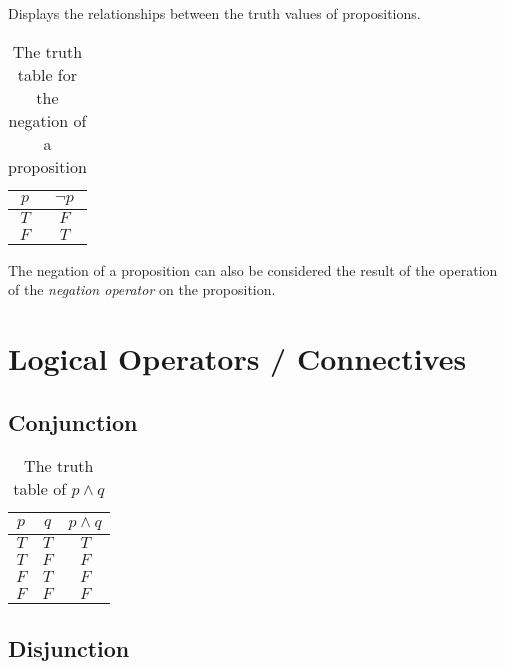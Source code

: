 \documentclass[12pt letter]{report}
\begin{document}
 {
  Displays the relationships between the truth values of propositions.
}


\begin{table}[h!]
  \centering
  \begin{tabular}{|c|c|}
    \hline
    $p$ & $\neg p$ \\[0.5ex]
    \hline
    \hline
    $T$ & $F$      \\
    $F$ & $T$      \\
    \hline
  \end{tabular}
  \caption{The truth table for the negation of a proposition}
  \label{tab:1}
\end{table}

The negation of a proposition can also be considered the result of the operation of the \textit{negation operator} on
the proposition.

\section{Logical Operators / Connectives}

\subsection{Conjunction}

\begin{table}[h!]
  \caption{The truth table of $p \wedge q$}\label{tab:2}
  \begin{center}
    \begin{tabular}{|c c|c|}
      \hline
      $p$ & $q$ & $p \wedge q$ \\[0.5ex]
      \hline
      \hline
      $T$ & $T$ & $T$          \\
      $T$ & $F$ & $F$          \\
      $F$ & $T$ & $F$          \\
      $F$ & $F$ & $F$          \\
      \hline
    \end{tabular}
  \end{center}
\end{table}


\subsection{Disjunction}
\end{document}
